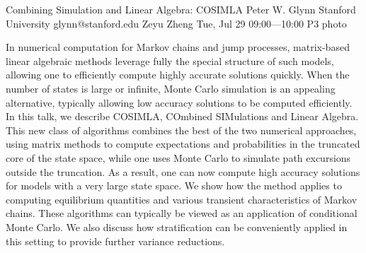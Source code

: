 \clearpage
\begin{talk}
  {Combining Simulation and Linear Algebra: COSIMLA}%
  {Peter W. Glynn}%
  {Stanford University}%
  {glynn@stanford.edu}%
  {Zeyu Zheng}%
  {}%
  {Tue, Jul 29 09:00---10:00}%
  {P3}%
  {photo}%
  
    
   
In numerical computation for Markov chains and jump processes, matrix-based linear algebraic methods leverage fully the special structure of such models, allowing one to efficiently compute highly accurate solutions quickly. When the number of states is large or infinite, Monte Carlo simulation is an appealing alternative, typically allowing low accuracy solutions to be computed efficiently. In this talk, we describe COSIMLA, COmbined SIMulations and Linear Algebra. This new class of algorithms combines the best of the two numerical approaches, using matrix methods to compute expectations and probabilities in the truncated core of the state space, while one uses Monte Carlo to simulate path excursions outside the truncation. As a result, one can now compute high accuracy solutions for models with a very large state space. We show how the method applies to computing equilibrium quantities and various transient characteristics of Markov chains. These algorithms can typically be viewed as an application of conditional Monte Carlo. We also discuss how stratification can be conveniently applied in this setting to provide further variance reductions.  

\end{talk}


